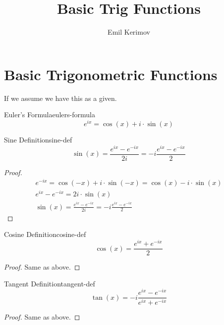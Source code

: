 \documentclass[a4paper]{article}
\title{Basic Trig Functions}
\author{Emil Kerimov}
\date{}
\begin{document}
\maketitle

\section{Basic Trigonometric Functions}\label{btf:sec:basic-trig-functions}
If we assume we have this as a given.

\begin{mydefinition}{Euler's Formula}{eulers-formula}
\begin{equation}
    e^{ix} = \cos(x) + i \cdot \sin(x)
\end{equation}
\end{mydefinition}


\begin{mytheorem}{Sine Definition}{sine-def}
    \begin{equation}
        \sin(x) = \frac{e^{ix} - e^{-ix}}{2i} = -i \frac{e^{ix} - e^{-ix}}{2}
    \end{equation}

    \begin{proof}
        \begin{gather*}
            e^{-ix} = \cos(-x) + i \cdot \sin(-x) = \cos(x) - i \cdot \sin(x) \\
            e^{ix} - e^{-ix} = 2i \cdot \sin(x) \\
            \sin(x) = \frac{e^{ix} - e^{-ix}}{2i} = -i \frac{e^{ix} - e^{-ix}}{2}
        \end{gather*}
    \end{proof}
\end{mytheorem}

\begin{mytheorem}{Cosine Definition}{cosine-def}
    \begin{equation}
        \cos(x) = \frac{e^{ix} + e^{-ix}}{2}
    \end{equation}
    \begin{proof}
        Same as above.
    \end{proof}
\end{mytheorem}

\begin{mytheorem}{Tangent Definition}{tangent-def}
    \begin{equation}
        \tan(x) = -i \frac{e^{ix} - e^{-ix}}{e^{ix} + e^{-ix}}
    \end{equation}
    \begin{proof}
        Same as above.
    \end{proof}
\end{mytheorem}
\end{document}
